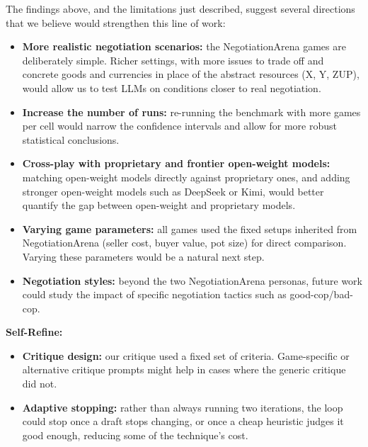 The findings above, and the limitations just described, suggest several directions that we believe would strengthen this line of work:

\begin{itemize}
    \item \textbf{More realistic negotiation scenarios:} the NegotiationArena games are deliberately simple. Richer settings, with more issues to trade off and concrete goods and currencies in place of the abstract resources (X, Y, ZUP), would allow us to test LLMs on conditions closer to real negotiation.
    \item \textbf{Increase the number of runs:} re-running the benchmark with more games per cell would narrow the confidence intervals and allow for more robust statistical conclusions.
    \item \textbf{Cross-play with proprietary and frontier open-weight models:} matching open-weight models directly against proprietary ones, and adding stronger open-weight models such as DeepSeek or Kimi, would better quantify the gap between open-weight and proprietary models.
    \item \textbf{Varying game parameters:} all games used the fixed setups inherited from NegotiationArena (seller cost, buyer value, pot size) for direct comparison. Varying these parameters would be a natural next step.
    \item \textbf{Negotiation styles:} beyond the two NegotiationArena personas, future work could study the impact of specific negotiation tactics such as good-cop/bad-cop.
\end{itemize}

\textbf{Self-Refine:}
\begin{itemize}
    \item \textbf{Critique design:} our critique used a fixed set of criteria. Game-specific or alternative critique prompts might help in cases where the generic critique did not.
    \item \textbf{Adaptive stopping:} rather than always running two iterations, the loop could stop once a draft stops changing, or once a cheap heuristic judges it good enough, reducing some of the technique's cost.
\end{itemize}

